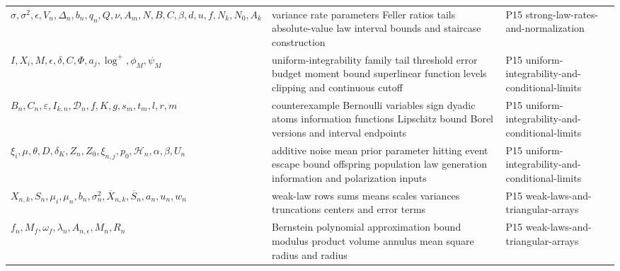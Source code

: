 \begin{longtable}{@{}p{}p{}p{}@{}}
\(\sigma,\allowbreak \sigma^2,\allowbreak \epsilon,\allowbreak V_n,\allowbreak \Delta_n,\allowbreak b_n,\allowbreak q_n,\allowbreak Q,\allowbreak \nu,\allowbreak A_m,\allowbreak N,\allowbreak B,\allowbreak C,\allowbreak \beta,\allowbreak d,\allowbreak u,\allowbreak f,\allowbreak N_k,\allowbreak N_0,\allowbreak A_k\) & variance rate parameters Feller ratios tails absolute-value law interval bounds and staircase construction & P15 strong-\allowbreak{}law-\allowbreak{}rates-\allowbreak{}and-\allowbreak{}normalization \\
\(I,\allowbreak X_i,\allowbreak M,\allowbreak \epsilon,\allowbreak \delta,\allowbreak C,\allowbreak \Phi,\allowbreak a_j,\allowbreak \log^+,\allowbreak \phi_M,\allowbreak \psi_M\) & uniform-integrability family tail threshold error budget moment bound superlinear function levels clipping and continuous cutoff & P15 uniform-\allowbreak{}integrability-\allowbreak{}and-\allowbreak{}conditional-\allowbreak{}limits \\
\(B_n,\allowbreak C_n,\allowbreak \varepsilon,\allowbreak I_{k,n},\allowbreak \mathcal D_n,\allowbreak f,\allowbreak K,\allowbreak g,\allowbreak s_m,\allowbreak t_m,\allowbreak l,\allowbreak r,\allowbreak m\) & counterexample Bernoulli variables sign dyadic atoms information functions Lipschitz bound Borel versions and interval endpoints & P15 uniform-\allowbreak{}integrability-\allowbreak{}and-\allowbreak{}conditional-\allowbreak{}limits \\
\(\xi_i,\allowbreak \mu,\allowbreak \theta,\allowbreak D,\allowbreak \delta_K,\allowbreak Z_n,\allowbreak Z_0,\allowbreak \xi_{n,j},\allowbreak p_0,\allowbreak \mathcal H_n,\allowbreak \alpha,\allowbreak \beta,\allowbreak U_n\) & additive noise mean prior parameter hitting event escape bound offspring population law generation information and polarization inputs & P15 uniform-\allowbreak{}integrability-\allowbreak{}and-\allowbreak{}conditional-\allowbreak{}limits \\
\(X_{n,k},\allowbreak S_n,\allowbreak \mu_i,\allowbreak \mu_n,\allowbreak b_n,\allowbreak \sigma_n^2,\allowbreak \overline X_{n,k},\allowbreak \overline S_n,\allowbreak a_n,\allowbreak u_n,\allowbreak w_n\) & weak-law rows sums means scales variances truncations centers and error terms & P15 weak-\allowbreak{}laws-\allowbreak{}and-\allowbreak{}triangular-\allowbreak{}arrays \\
\(f_n,\allowbreak M_f,\allowbreak \omega_f,\allowbreak \lambda_n,\allowbreak A_{n,\epsilon},\allowbreak M_n,\allowbreak R_n\) & Bernstein polynomial approximation bound modulus product volume annulus mean square radius and radius & P15 weak-\allowbreak{}laws-\allowbreak{}and-\allowbreak{}triangular-\allowbreak{}arrays \\

\end{longtable}

